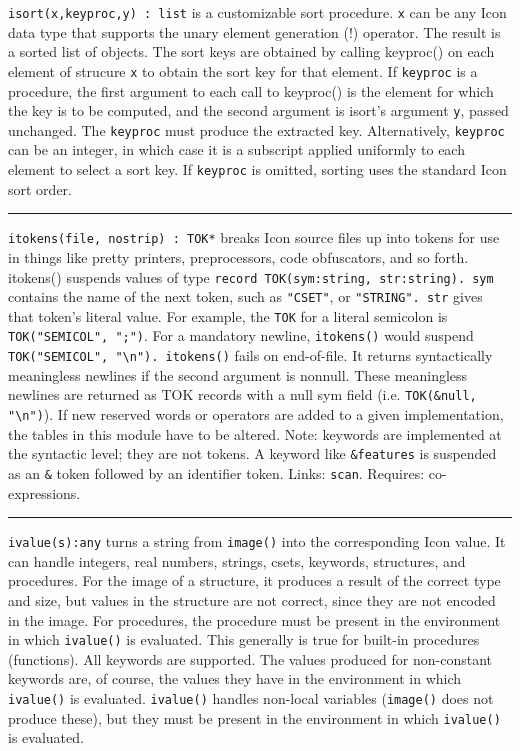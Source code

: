 \texttt{i}\texttt{sort}\texttt{(x,keyproc,y) : list} is a
customizable sort procedure. \texttt{x} can be any Icon data type that
supports the unary element generation (!) operator. The result is a
sorted list of objects. The sort keys are obtained by calling
keyproc() on each element of strucure \texttt{x} to obtain the sort
key for that element. If
\texttt{keyproc} is a procedure, the first argument to each call to
keyproc() is the element for which the key is to be computed,
and the second argument is isort's argument
\texttt{y}, passed unchanged. The \texttt{keyproc} must produce the
extracted key. Alternatively, \texttt{keyproc} can be an integer, in
which case it is a subscript applied uniformly to each element to select
a sort key. If \texttt{keyproc} is omitted, sorting uses
the standard Icon sort order.

\vspace{0.25cm}\hrule{}

\texttt{itokens(file, nostrip) : TOK*} breaks Icon source files up into
tokens for use in things like pretty printers, preprocessors, code
obfuscators, and so forth. itokens() suspends values of type
\texttt{record TOK(sym:string, str:string). sym} contains the name of
the next token, such as \texttt{"CSET"}, or
\texttt{"STRING". str} gives that
token's literal value. For example, the \texttt{TOK}
for a literal semicolon is
\texttt{TOK("SEMICOL",
";")}. For a mandatory newline,
\texttt{itokens()} would suspend
\texttt{TOK("SEMICOL",
"{\textbackslash}n"). itokens()} fails on
end-of-file. It returns syntactically meaningless newlines if the
second argument is nonnull. These meaningless newlines are returned as
TOK records with a null sym field (i.e. \texttt{TOK(\&null,
"{\textbackslash}n")}). If new reserved
words or operators are added to a given implementation, the tables in
this module have to be altered. Note: keywords are implemented at the
syntactic level; they are not tokens. A keyword like
\texttt{\&features} is suspended as an \texttt{\&} token followed by an
identifier token.
Links: \texttt{scan}. Requires: co-expressions.

\vspace{0.25cm}\hrule{}

\texttt{ivalue(s):any} turns a string from \texttt{image()} into the
corresponding Icon value. It can handle integers, real numbers,
strings, csets, keywords, structures, and procedures. For the image of
a structure, it produces a result of the correct type and size, but
values in the structure are not correct, since they are not encoded in
the image. For procedures, the procedure must be present in the
environment in which \texttt{ivalue()} is evaluated. This generally is
true for built-in procedures (functions). All keywords are supported.
The values produced for non-constant keywords are, of course, the
values they have in the environment in which \texttt{ivalue()} is
evaluated. \texttt{ivalue()} handles non-local variables
(\texttt{image()} does not produce these), but they must be present in
the environment in which \texttt{ivalue()} is evaluated. 

